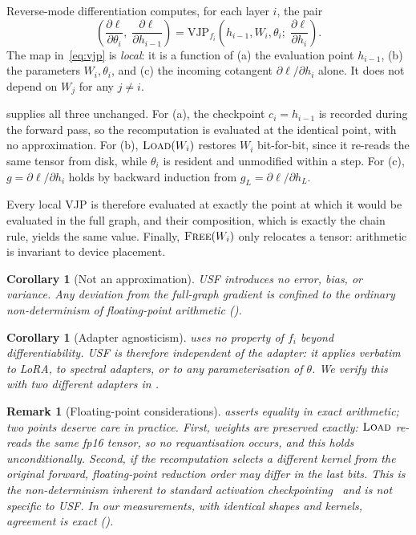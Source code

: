 \documentclass[journal]{IEEEtran}
\newtheorem{corollary}[theorem]{Corollary}
\newtheorem{remark}[theorem]{Remark}
\newcommand{\usf}{USF}
\newcommand{\VJP}{\mathrm{VJP}}
\begin{document}
\begin{IEEEproof}
Reverse-mode differentiation computes, for each layer $i$, the pair
\begin{equation}
\label{eq:vjp}
\left(\frac{\partial\ell}{\partial\theta_i},\; \frac{\partial\ell}{\partial h_{i-1}}\right)
= \VJP_{f_i}\!\left(h_{i-1}, W_i, \theta_i;\; \frac{\partial\ell}{\partial h_i}\right).
\end{equation}
The map in~\eqref{eq:vjp} is \emph{local}: it is a function of (a) the evaluation point $h_{i-1}$,
(b) the parameters $W_i,\theta_i$, and (c) the incoming cotangent $\partial\ell/\partial h_i$
alone. It does not depend on $W_j$ for any $j \neq i$.

 supplies all three unchanged. For (a), the checkpoint $c_i = h_{i-1}$ is recorded
during the forward pass, so the recomputation is evaluated at the identical point, with no
approximation. For (b), $\textsc{Load}(W_i)$ restores $W_i$ bit-for-bit, since it re-reads the same
tensor from disk, while $\theta_i$ is resident and unmodified within a step. For (c),
$g=\partial\ell/\partial h_i$ holds by backward induction from $g_L = \partial\ell/\partial h_L$.

Every local VJP is therefore evaluated at exactly the point at which it would be evaluated in the
full graph, and their composition, which is exactly the chain rule, yields the same value.
Finally, $\textsc{Free}(W_i)$ only relocates a tensor: arithmetic is invariant to device placement.
\end{IEEEproof}

\begin{corollary}[Not an approximation]
\label{cor:noapprox}
\usf{} introduces no error, bias, or variance. Any deviation from the full-graph gradient is
confined to the ordinary non-determinism of floating-point arithmetic ().
\end{corollary}

\begin{corollary}[Adapter agnosticism]
\label{cor:agnostic}
 uses no property of $f_i$ beyond differentiability. \usf{} is therefore
independent of the adapter: it applies verbatim to LoRA, to spectral adapters, or to any
parameterisation of $\theta$. We verify this with two different adapters in .
\end{corollary}

\begin{remark}[Floating-point considerations]
\label{rem:fp}
 asserts equality in exact arithmetic; two points deserve care in practice. First,
weights are preserved exactly: $\textsc{Load}$ re-reads the same fp16 tensor, so no requantisation
occurs, and this holds unconditionally. Second, if the recomputation selects a different kernel
from the original forward, floating-point reduction order may differ in the last bits. This is the
non-determinism inherent to standard activation checkpointing~\cite{chen2016checkpointing} and is
not specific to \usf{}. In our measurements, with identical shapes and kernels, agreement is exact
().
\end{remark}
\end{document}
